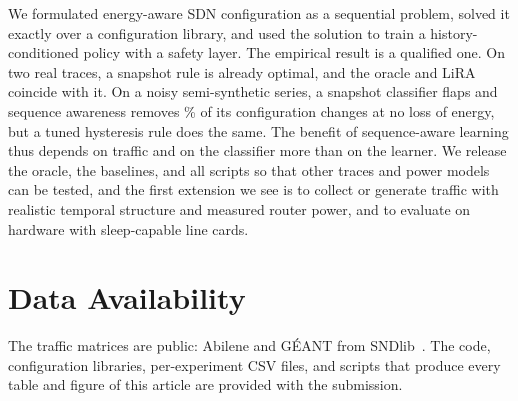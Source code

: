 \documentclass[journal]{IEEEtran}
\begin{document}
We formulated energy-aware SDN configuration as a sequential problem, solved it exactly over a configuration library, and used the solution to train a history-conditioned policy with a safety layer. The empirical result is a qualified one. On two real traces, a snapshot rule is already optimal, and the oracle and LiRA coincide with it. On a noisy semi-synthetic series, a snapshot classifier flaps and sequence awareness removes \nobY\% of its configuration changes at no loss of energy, but a tuned hysteresis rule does the same. The benefit of sequence-aware learning thus depends on traffic and on the classifier more than on the learner. We release the oracle, the baselines, and all scripts so that other traces and power models can be tested, and the first extension we see is to collect or generate traffic with realistic temporal structure and measured router power, and to evaluate on hardware with sleep-capable line cards.

\section*{Data Availability}
The traffic matrices are public: Abilene and G\'{E}ANT from SNDlib~\cite{orlowski2010sndlib,uhlig2006geant,zhang2003tomogravity}. The code, configuration libraries, per-experiment CSV files, and scripts that produce every table and figure of this article are provided with the submission.



\end{document}
